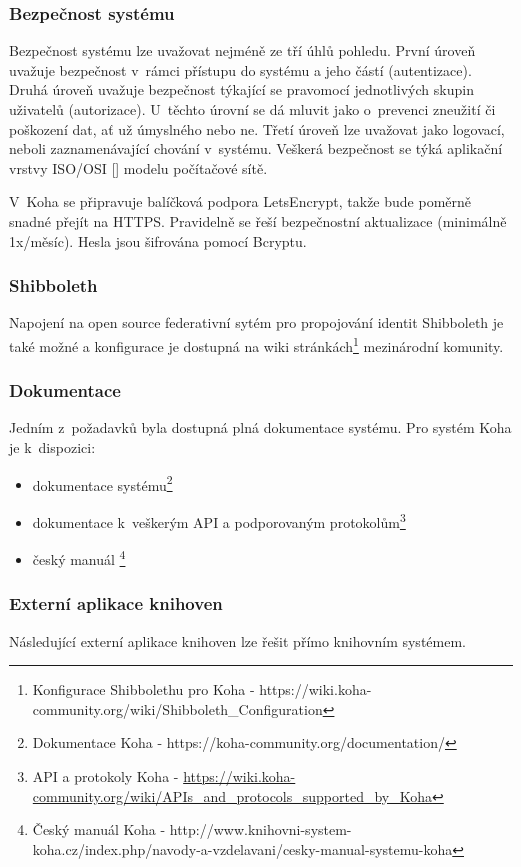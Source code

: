 \documentclass[
	11pt, oneside, printed, final, palatino, monochrome
	microtype,
	table,   %
	lof,     %
	lot     %
]{fithesis3}
\newcommand{\citepages}[2]{[\cite[#1]{#2}]}
\begin{document}
{\subsubsection{Bezpečnost systému}
Bezpečnost systému lze uvažovat nejméně ze tří úhlů pohledu. První úroveň uvažuje bezpečnost v~rámci přístupu do systému a jeho částí (autentizace). Druhá úroveň uvažuje bezpečnost týkající se pravomocí jednotlivých skupin uživatelů (autorizace). U~těchto úrovní se dá mluvit jako o~prevenci zneužití či poškození dat, ať už úmyslného nebo ne. Třetí úroveň lze uvažovat jako logovací, neboli zaznamenávající chování v~systému. Veškerá bezpečnost se týká aplikační vrstvy ISO/OSI \citepages{80-82}{kurose_ross_2014} modelu počítačové sítě.

V~Koha se připravuje balíčková podpora LetsEncrypt, takže bude poměrně snadné přejít na HTTPS. Pravidelně se řeší bezpečnostní aktualizace (minimálně 1x/měsíc). Hesla jsou šifrována pomocí Bcryptu.

\subsubsection{Shibboleth}
Napojení na open source federativní sytém pro propojování identit Shibboleth je také možné a konfigurace je dostupná na wiki stránkách\footnote{Konfigurace Shibbolethu pro Koha - https://wiki.koha-community.org/wiki/Shibboleth\_Configuration} mezinárodní komunity.

\subsubsection{Dokumentace}
Jedním z~požadavků byla dostupná plná dokumentace systému. Pro systém Koha je k~dispozici:

\begin{itemize}
\item dokumentace systému\footnote{Dokumentace Koha - https://koha-community.org/documentation/}
\item dokumentace k~veškerým API a podporovaným protokolům\footnote{API a protokoly Koha - \url{https://wiki.koha-community.org/wiki/APIs\_and\_protocols\_supported\_by\_Koha}}
\item český manuál \footnote{Český manuál Koha - http://www.knihovni-system-koha.cz/index.php/navody-a-vzdelavani/cesky-manual-systemu-koha}
\end{itemize}

\subsubsection{Externí aplikace knihoven}
Následující externí aplikace knihoven lze řešit přímo knihovním systémem.

}
\end{document}
